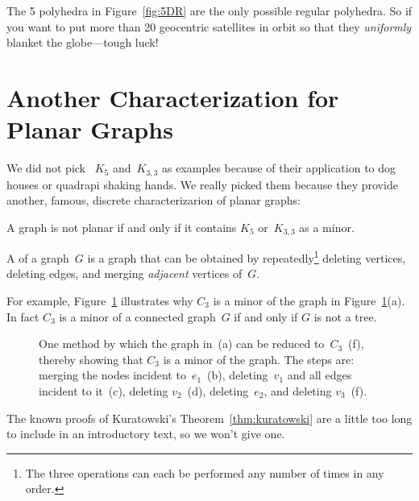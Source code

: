 The 5 polyhedra in Figure~\ref{fig:5DR} are the only possible regular
polyhedra.  So if you want to put more than 20 geocentric satellites
in orbit so that they \emph{uniformly} blanket the globe---tough luck!

\section{Another Characterization for Planar Graphs}

We did not pick ~$K_5$ and~$K_{3, 3}$ as examples because of their
application to dog houses or quadrapi shaking hands.  We really picked
them because they provide another, famous, discrete characterizarion
of planar graphs:
\begin{theorem}[Kuratowski]\label{thm:kuratowski}
A graph is not planar if and only if it contains $K_5$ or~$K_{3, 3}$
as a minor.
\end{theorem}

\begin{definition}
  A  of a graph~$G$ is a graph that can be obtained by
  repeatedly\footnote{The three operations can each be performed any
    number of times in any order.} deleting vertices, deleting edges,
  and merging \emph{adjacent} vertices
  of~$G$.
\end{definition}

For example, Figure~\ref{fig:5DL} illustrates why $C_3$ is a minor of
the graph in Figure~\ref{fig:5DL}(a).  In fact $C_3$ is a minor of a
connected graph~$G$ if and only if $G$ is not a tree.

\begin{figure}



\caption{One method by which the graph in~(a) can be reduced
  to~$C_3$~(f), thereby showing that $C_3$ is a minor of the graph.
  The steps are: merging the nodes incident to~$e_1$~(b),
  deleting~$v_1$ and all edges incident to it~(c), deleting $v_2$~(d),
deleting~$e_2$, and deleting $v_3$~(f).}

\label{fig:5DL}
\end{figure}

The known proofs of Kuratowski's Theorem~\ref{thm:kuratowski} are a little
too long to include in an introductory text, so we won't give one.



